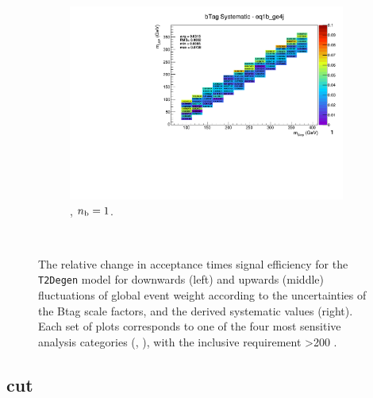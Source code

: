 \begin{figure}[ht!]
\begin{subfigure}[b]{0.32\textwidth}
    \includegraphics[width=\textwidth, page=1]{Figs/sms/t2degen/v19_2/systs/T2_4body_bTag_eq1b_ge4j.pdf}
    \caption{\njhigh, $n_{\text{b}} = 1$.}
  \end{subfigure}\\
  \caption{The relative change in acceptance times signal efficiency for the
  \texttt{T2Degen} model for downwards (left) and upwards (middle) fluctuations
  of global event weight according to the uncertainties of the Btag scale 
  factors,
  and the derived systematic values (right). Each set of plots corresponds
  to one of the four most sensitive analysis categories (\nb, \nj), with the
  inclusive requirement \HT>200 \gev.}
  \label{fig:sms-btag-t2degen}
\end{figure}


\newpage
\subsection*{\mhtmet cut}
\label{sec:t2degen_mhtmet_plots}

